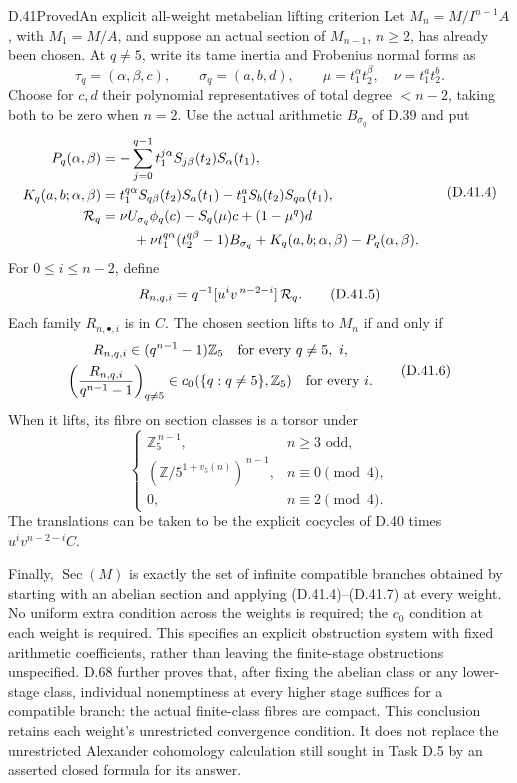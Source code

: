 \begin{statement}{D.41}{Proved}{An explicit all-weight metabelian lifting criterion}
Let \(M_n=M/I^{n-1}A\), with \(M_1=M/A\), and suppose an
actual section of \(M_{n-1}\), \(n\ge2\), has already been
chosen. At \(q\ne5\), write its tame inertia and Frobenius
normal forms as
\[
 \tau_q=(\alpha,\beta,c),\qquad
 \sigma_q=(a,b,d),\qquad
 \mu=t_1^\alpha t_2^\beta,\quad \nu=t_1^at_2^b.
\]
Choose for \(c,d\) their polynomial representatives of
total degree \(<n-2\), taking both to be zero when \(n=2\).
Use the actual arithmetic \(B_{\sigma_q}\) of D.39 and put
\[
\begin{split}
 P_q(\alpha,\beta)
  &=-\sum_{j=0}^{q-1}
           t_1^{j\alpha}S_{j\beta}(t_2)S_\alpha(t_1),\\
 K_q(a,b;\alpha,\beta)
  &=t_1^{q\alpha}S_{q\beta}(t_2)S_a(t_1)
                 -t_1^aS_b(t_2)S_{q\alpha}(t_1),\\
 {\cal R}_q
  &=\nu U_{\sigma_q}\phi_q(c)-S_q(\mu)c
          +(1-\mu^q)d\\
  &\hspace{8mm}
       +\nu t_1^{q\alpha}(t_2^{q\beta}-1)B_{\sigma_q}
           +K_q(a,b;\alpha,\beta)-P_q(\alpha,\beta).
\end{split}
\tag{D.41.4}
\]
For \(0\le i\le n-2\), define
\[
 R_{n,q,i}=q^{-1}
              [u^iv^{\,n-2-i}]\,{\cal R}_q.              \tag{D.41.5}
\]
Each family \(R_{n,\bullet,i}\) is in \(C\).
The chosen section lifts to \(M_n\) if and only if
\[
\begin{gathered}
 R_{n,q,i}\in(q^{n-1}-1)\mathbb Z_5
                         \quad\hbox{for every }q\ne5,\ i,\\
 \left(\frac{R_{n,q,i}}{q^{n-1}-1}\right)_{q\ne5}
                  \in c_0(\{q:q\ne5\},\mathbb Z_5)
                         \quad\hbox{for every }i.
\end{gathered}
\tag{D.41.6}
\]
When it lifts, its fibre on section classes is a torsor under
\[
 \begin{cases}
    \mathbb Z_5^{\,n-1},&n\ge3\text{ odd},\\
    (\mathbb Z/5^{1+v_5(n)})^{\,n-1},&n\equiv0\pmod4,\\
    0,&n\equiv2\pmod4.
 \end{cases}                                           \tag{D.41.7}
\]
The translations can be taken to be the explicit cocycles
of D.40 times \(u^iv^{n-2-i}C\).

Finally, \(\operatorname{Sec}(M)\) is exactly the set of
infinite compatible branches obtained by starting with
an abelian section and applying (D.41.4)--(D.41.7)
at every weight. No uniform extra condition across the
weights is required; the \(c_0\) condition at each weight
is required. This specifies an explicit obstruction
system with fixed arithmetic coefficients, rather than
leaving the finite-stage obstructions unspecified.
D.68 further proves that, after fixing the
abelian class or any lower-stage class, individual
nonemptiness at every higher stage suffices for
a compatible branch: the actual finite-class
fibres are compact. This conclusion retains
each weight's unrestricted convergence condition.
It does not replace the unrestricted Alexander
cohomology calculation still sought in Task D.5
by an asserted closed formula for its answer.
\end{statement}
